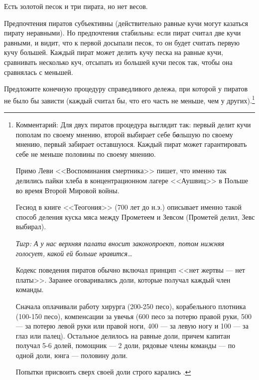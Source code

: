 \begin{problem}
\begin{source} \cite{brams:efcdp} \end{source}
Есть золотой песок и три пирата, но нет весов.\par
Предпочтения пиратов субъективны (действительно равные кучи могут казаться пирату неравными). Но предпочтения стабильны: если пират считал две кучи равными,  и видит, что к первой досыпали песок, то он будет считать первую кучу большей. Каждый пират может делить кучу песка на равные кучи, сравнивать несколько куч, отсыпать из большей кучи песок так, чтобы она сравнялась с меньшей.\par

Предложите конечную процедуру справедливого дележа, при которой у пиратов не было бы зависти (каждый считал бы, что его часть не меньше, чем у других).\footnote{ Комментарий: Для двух пиратов процедура выглядит так: первый делит кучи пополам по своему мнению, второй выбирает себе б{\bf {\it о}}льшую по своему мнению, первый забирает оставшуюся. Каждый пират может гарантировать себе не меньше половины по своему мнению. \par
Примо Леви <<Воспоминания смертника>> пишет, что именно так делились пайки хлеба в концентрационном лагере <<Аушвиц>> в Польше во время Второй Мировой войны. \par
Гесиод в книге <<Теогония>> (700 лет до н.э.) описывает именно такой способ деления куска мяса между Прометеем и Зевсом (Прометей делил, Зевс выбирал). \par
{\it Тигр: А у нас верхняя палата вносит законопроект, потом нижняя голосует, какой ей больше нравится\ldots }

Кодекс поведения пиратов обычно включал принцип <<нет жертвы --- нет платы>>. Заранее оговаривались доли, которые получал каждый член команды.\par
Сначала оплачивали работу хирурга (200-250 песо), корабельного плотника (100-150 песо), компенсации за увечья (600 песо за потерю правой руки, 500 --- за потерю левой руки или правой ноги, 400 --- за левую ногу и 100 --- за глаз или палец). Остальное делилось на равные доли, причем капитан получал 5-6 долей, помощник --- 2 доли, рядовые члены команды  --- по одной доли, юнга --- половину доли.\par
Попытки присвоить сверх своей доли строго карались \cite{brams:dps}. }



\begin{sol}

\end{sol}
\end{problem}



